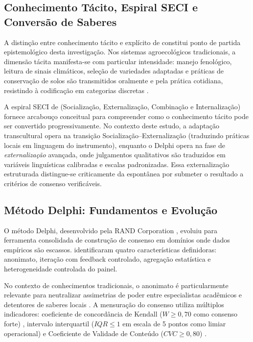 \subsection{Conhecimento Tácito, Espiral SECI e Conversão de Saberes}

A distinção entre conhecimento tácito e explícito de  constitui ponto de partida epistemológico desta investigação. Nos sistemas agroecológicos tradicionais, a dimensão tácita manifesta-se com particular intensidade: manejo fenológico, leitura de sinais climáticos, seleção de variedades adaptadas e práticas de conservação de solos são transmitidos oralmente e pela prática cotidiana, resistindo à codificação em categorias discretas \cite{Berkes2017,Toledo2008}.

A espiral SECI de  (Socialização, Externalização, Combinação e Internalização) fornece arcabouço conceitual para compreender como o conhecimento tácito pode ser convertido progressivamente. No contexto deste estudo, a adaptação transcultural opera na transição Socialização--Externalização (traduzindo práticas locais em linguagem do instrumento), enquanto o Delphi opera na fase de \textit{externalização} avançada, onde julgamentos qualitativos são traduzidos em variáveis linguísticas calibradas e escalas padronizadas. Essa externalização estruturada distingue-se criticamente da espontânea por submeter o resultado a critérios de consenso verificáveis.

\subsection{Método Delphi: Fundamentos e Evolução}

O método Delphi, desenvolvido pela RAND Corporation \cite{Linstone1975}, evoluiu para ferramenta consolidada de construção de consenso em domínios onde dados empíricos são escassos.  identificaram quatro características definidoras: anonimato, iteração com feedback controlado, agregação estatística e heterogeneidade controlada do painel.

No contexto de conhecimentos tradicionais, o anonimato é particularmente relevante para neutralizar assimetrias de poder entre especialistas acadêmicos e detentores de saberes locais \cite{Hasson2000}. A mensuração do consenso utiliza múltiplos indicadores: coeficiente de concordância de Kendall ($W \geq 0,70$ como consenso forte) \cite{Schmidt2014}, intervalo interquartil ($IQR \leq 1$ em escala de 5 pontos como limiar operacional) \cite{VonDerGracht2012} e Coeficiente de Validade de Conteúdo ($CVC \geq 0,80$) \cite{Hernandez-Nieto2002}.

